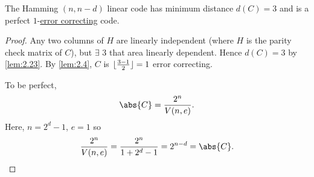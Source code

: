 \documentclass{article}
\DeclarePairedDelimiter{\floor}{\lfloor}{\rfloor}
\newcommand{\1}[1]{\mathbbm{1}_{#1}}
\begin{document}
\begin{nlemma}\label{lem:2.24}
    The Hamming $(n, n-d)$ linear code has minimum distance $d(C) =3$ and is a perfect $1$-\hyperlink{def:errorCor}{error correcting} code.
\end{nlemma}
\begin{proof}
    Any two columns of $H$ are linearly independent (where $H$ is the parity check matrix of $C$), but $\exists$ 3 that area linearly dependent. Hence $d(C) = 3$ by \cref{lem:2.23}.
    By \cref{lem:2.4}, $C$ is $\floor{\frac{3-1}{2}} = 1$ error correcting.

    To be perfect,
    \begin{equation*}
        \abs{C} = \frac{2^n}{V(n, e)}.
    \end{equation*}
    Here, $n=2^d - 1$, $e = 1$ so
    \begin{equation*}
        \frac{2^n}{V(n, e)} = \frac{2^n}{1+2^d - 1} = 2^{n-d} = \abs{C}. \qedhere
    \end{equation*}
\end{proof}
\end{document}
